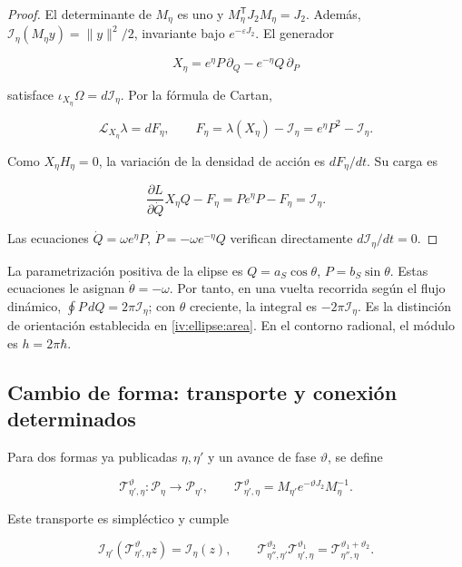 \begin{proof}
El determinante de \(M_\eta\) es uno y \(M_\eta^{\mathsf T}J_2M_\eta=J_2\). Además,
\(\mathcal I_\eta(M_\eta y)=\|y\|^2/2\), invariante bajo \(e^{-\varepsilon J_2}\).
El generador

\[
X_\eta=e^\eta P\,\partial_Q-e^{-\eta}Q\,\partial_P
\]

satisface \(\iota_{X_\eta}\Omega=d\mathcal I_\eta\). Por la fórmula de Cartan,

\[
\mathcal L_{X_\eta}\lambda=dF_\eta,\qquad
F_\eta=\lambda(X_\eta)-\mathcal I_\eta=e^\eta P^2-\mathcal I_\eta.
\]

Como \(X_\eta H_\eta=0\), la variación de la densidad de acción es \(dF_\eta/dt\). Su carga es

\[
\frac{\partial L}{\partial\dot Q}X_\eta Q-F_\eta
=Pe^\eta P-F_\eta=\mathcal I_\eta.
\]

Las ecuaciones \(\dot Q=\omega e^\eta P\), \(\dot P=-\omega e^{-\eta}Q\) verifican directamente \(d\mathcal I_\eta/dt=0\).
\end{proof}

La parametrización positiva de la elipse es \(Q=a_S\cos\theta\), \(P=b_S\sin\theta\). Estas ecuaciones le asignan \(\dot\theta=-\omega\). Por tanto, en una vuelta recorrida según el flujo dinámico, \(\oint P\,dQ=2\pi\mathcal I_\eta\); con \(\theta\) creciente, la integral es \(-2\pi\mathcal I_\eta\). Es la distinción de orientación establecida en \cref{iv:ellipse:area}. En el contorno radional, el módulo es \(h=2\pi\hbar\).

\subsection{Cambio de forma: transporte y conexión determinados}

Para dos formas ya publicadas \(\eta,\eta'\) y un avance de fase \(\vartheta\), se define

\begin{equation}
\mathcal T_{\eta',\eta}^{\vartheta}:\mathcal P_\eta\to\mathcal P_{\eta'},
\qquad
\mathcal T_{\eta',\eta}^{\vartheta}
=M_{\eta'}e^{-\vartheta J_2}M_\eta^{-1}.
\label{nuc07:eq:4}
\end{equation}

\begin{proposition}
Este transporte es simpléctico y cumple

\begin{equation}
\mathcal I_{\eta'}(\mathcal T_{\eta',\eta}^{\vartheta}z)
=\mathcal I_\eta(z),\qquad
\mathcal T_{\eta'',\eta'}^{\vartheta_2}
\mathcal T_{\eta',\eta}^{\vartheta_1}
=\mathcal T_{\eta'',\eta}^{\vartheta_1+\vartheta_2}.
\label{nuc07:eq:5}
\end{equation}
\end{proposition}

